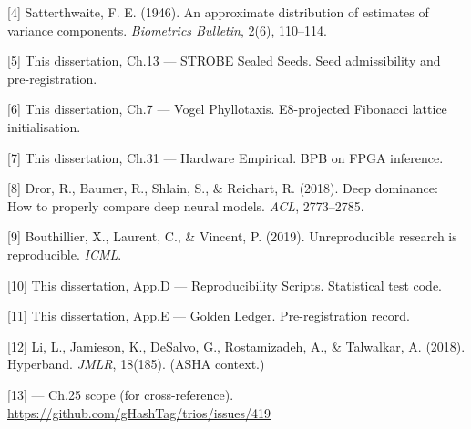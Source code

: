 [4] Satterthwaite, F. E. (1946). An
approximate distribution of estimates of variance
components. \emph{Biometrics Bulletin}, 2(6),
110--114.

[5] This dissertation, Ch.13 --- STROBE Sealed
Seeds. Seed admissibility and pre-registration.

[6] This dissertation, Ch.7 --- Vogel
Phyllotaxis. E8-projected Fibonacci lattice
initialisation.

[7] This dissertation, Ch.31 --- Hardware
Empirical. BPB on FPGA inference.

[8] Dror, R., Baumer, R., Shlain, S., \&
Reichart, R. (2018). Deep dominance: How to
properly compare deep neural models. \emph{ACL},
2773--2785.

[9] Bouthillier, X., Laurent, C., \& Vincent,
P. (2019). Unreproducible research is
reproducible. \emph{ICML}.

[10] This dissertation, App.D ---
Reproducibility Scripts. Statistical test code.

[11] This dissertation, App.E --- Golden
Ledger. Pre-registration record.

[12] Li, L., Jamieson, K., DeSalvo, G.,
Rostamizadeh, A., \& Talwalkar, A. (2018).
Hyperband. \emph{JMLR}, 18(185). (ASHA context.)

[13]  --- Ch.25
scope (for cross-reference).
\url{https://github.com/gHashTag/trios/issues/419}

